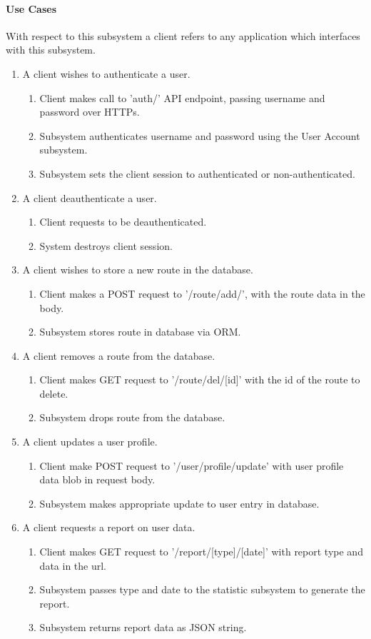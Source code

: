 \documentclass{article}
\begin{document}
\paragraph{Use Cases}
With respect to this subsystem a client refers to any application which interfaces with this subsystem.
\begin{enumerate}
\item A client wishes to authenticate a user.
    \begin{enumerate}
        \item Client makes call to 'auth/' API endpoint, passing username and password over HTTPs.
        \item Subsystem authenticates username and password using the User Account subsystem.
        \item Subsystem sets the client session to authenticated or non-authenticated.
    \end{enumerate}
\item A client deauthenticate a user.
    \begin{enumerate}
        \item Client requests to be deauthenticated.
        \item System destroys client session.
    \end{enumerate}
\item A client wishes to store a new route in the database.
    \begin{enumerate}
        \item Client makes a POST request to '/route/add/', with the route data in the body.
        \item Subsystem stores route in database via ORM.
    \end{enumerate}
\item A client removes a route from the database.
    \begin{enumerate}
        \item Client makes GET request to '/route/del/[id]' with the id of the route to delete.
        \item Subsystem drops route from the database.
    \end{enumerate}
\item A client updates a user profile.
    \begin{enumerate}
        \item Client make POST request to '/user/profile/update' with user profile data blob in request body.
        \item Subsystem makes appropriate update to user entry in database.
    \end{enumerate}
\item A client requests a report on user data.
    \begin{enumerate}
        \item Client makes GET request to '/report/[type]/[date]' with report type and data in the url.
        \item Subsystem passes type and date to the statistic subsystem to generate the report.
        \item Subsystem returns report data as JSON string.
    \end{enumerate}
\end{enumerate}
\end{document}
